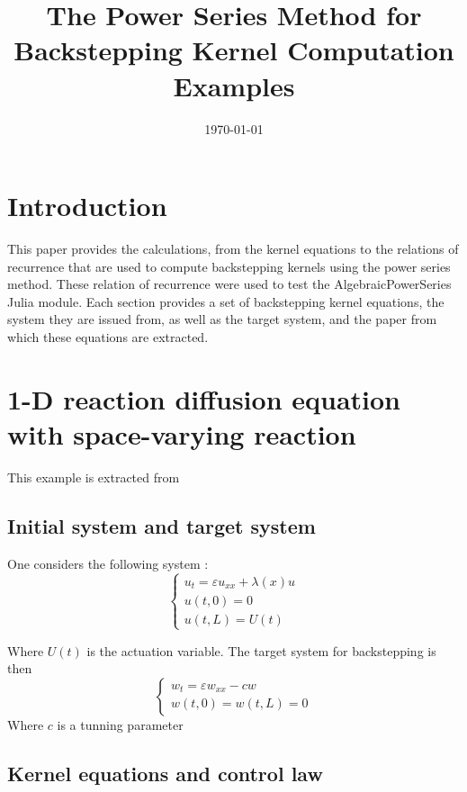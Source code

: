 \documentclass[11pt,a4paper]{article}
\title{\Huge \textbf{The Power Series Method for \\ Backstepping Kernel Computation} \\[12pt]
\Large Examples}
\date{\today}
\newcommand{\eps}{\varepsilon}
\begin{document}
\maketitle
\tableofcontents


\section*{Introduction}
This paper provides the calculations, from the kernel equations to the relations of recurrence that are used to compute backstepping kernels using the power series method. These relation of recurrence were used to test the AlgebraicPowerSeries Julia module. Each section provides a set of backstepping kernel equations, the system they are issued from, as well as the target system, and the paper from which these equations are extracted. 


\section{1-D reaction diffusion equation with space-varying reaction}

This example is extracted from ~\cite{vazquez-chen-qiao-krstic}

\subsection{Initial system and target system}

One considers the following system : 
$$\begin{cases}
  u_t = \eps u_{xx} + \lambda(x) u \\
  u(t,0) = 0 \\
  u(t,L) = U(t)
\end{cases}$$

Where $U(t)$ is the actuation variable. The target system for backstepping is then 
$$\begin{cases}
  w_t = \eps w_{xx} - cw \\
  w(t,0) = w(t,L) = 0
\end{cases}$$
Where $c$ is a tunning parameter

\subsection{Kernel equations and control law}
\end{document}
